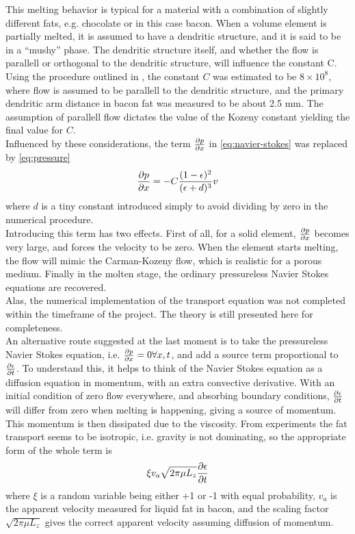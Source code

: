 This melting behavior is typical for a material with a combination of slightly different
fats, e.g. chocolate or in this case bacon. When a volume element is partially
melted, it is assumed to have a dendritic structure, and it is said to be in a
``mushy'' phase. The dendritic structure itself, and whether the flow is parallell or
orthogonal to the dendritic structure, will influence the constant C. \\

Using the procedure outlined in \cite{poirier}, the constant $C$ was estimated to be
$8 \times 10^8$, where flow is assumed to be parallell to the dendritic
structure, and the primary dendritic arm distance in bacon fat was measured to be
about 2.5 mm. The assumption of parallell flow dictates the value of the Kozeny
constant yielding the final value for $C$.\\

Influenced by these considerations, the term $\frac{\partial p}{\partial x}$ in
\cref{eq:navier-stokes} was replaced by \cref{eq:pressure}
\begin{equation}
  \frac{\partial p}{\partial x} =  -C\frac{ (1-\epsilon)^2}{(\epsilon+d)^3} v
  \label{eq:pressure}
\end{equation}
where $d$ is a tiny constant introduced simply to avoid dividing by zero in the
numerical procedure.\\

Introducing this term has two effects. First of all, for a solid element,
$\frac{\partial p}{\partial x}$ becomes very large, and forces the velocity to be zero. When the
element starts melting, the flow will mimic the Carman-Kozeny flow, which is
realistic for a porous medium. Finally in the molten stage, the ordinary
pressureless Navier Stokes equations are recovered.\\

Alas, the numerical implementation of the transport equation was not completed
within the timeframe of the project. The theory is still presented here for
completeness.\\ %

An alternative route suggested at the last moment is to take the pressureless
Navier Stokes equation, i.e. $\frac{\partial p}{\partial x} = 0 \forall x,t$, and add a source term
proportional to $\frac{\partial \epsilon}{\partial t}$. To understand this, it helps to think of the
Navier Stokes equation as a diffusion equation in momentum, with an extra
convective derivative. With an initial condition of zero flow everywhere, and
absorbing boundary conditions, $\frac{\partial \epsilon}{\partial t}$ will differ from zero when
melting is happening, giving a source of momentum. This momentum is then dissipated due to
the viscosity. From experiments the fat transport seems to be isotropic, i.e.
gravity is not dominating, so the appropriate form of the whole term is
\begin{equation}
  \xi v_a \sqrt{2\pi \mu L_z} \frac{\partial \epsilon}{\partial t}
  \label{eq:diffusion}
\end{equation}
where $\xi$ is a random variable being either +1 or -1 with equal probability,
$v_a$ is the apparent velocity measured for liquid fat in bacon, and the scaling
factor $\sqrt{2\pi\mu L_z}$ gives the correct apparent velocity assuming
diffusion of momentum.

